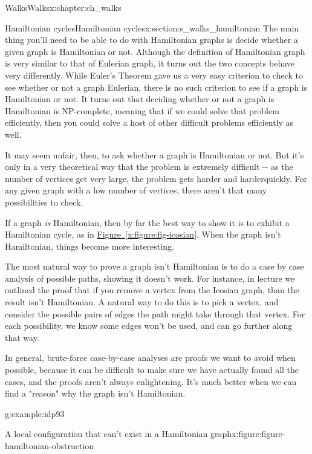 \documentclass[oneside,10pt,]{book}
\newcommand{\xreffont}{\relax}
\numberwithin{equation}{section}
\begin{document}
\begin{chapterptx}{Walks}{}{Walks}{}{}{x:chapter:ch_walks}
\begin{sectionptx}{Hamiltonian cycles}{}{Hamiltonian cycles}{}{}{x:section:s_walks_hamiltonian}
The main thing you'll need to be able to do with Hamiltonian graphs is decide whether a given graph is Hamiltonian or not.  Although the definition of Hamiltonian graph is very similar to that of Eulerian graph, it turns out the two concepts behave very differently.  While Euler's Theorem gave us a very easy criterion to check to see whether or not a graph Eulerian, there is no such criterion to see if a graph is Hamiltonian or not.  It turns out that deciding whether or not a graph is Hamiltonian is NP-complete, meaning that if we could solve that problem efficiently, then you could solve a host of other difficult problems efficiently as well.%
\par
It may seem unfair, then, to ask whether a graph is Hamiltonian or not.  But it's only in a very theoretical way that the problem is extremely difficult -{}-{} as the number of vertices get very large, the problem gets harder and harderquickly.  For any given graph with a low number of vertices, there aren't that many possibilities to check.%
\par
If a graph \emph{is} Hamiltonian, then by far the best way to show it is to exhibit a Hamiltonian cycle, as in \hyperref[x:figure:fig-icosian]{Figure~{\xreffont\ref{x:figure:fig-icosian}}}.  When the graph isn't Hamiltonian, things become more interesting.%
\par
The most natural way to prove a graph isn't Hamiltonian is to do a case by case analysis of possible paths, showing it doesn't work.  For instance, in lecture we outlined the proof that if you remove a vertex from the Icosian graph, than the result isn't Hamiltonian.  A natural way to do this is to pick a vertex, and consider the possible pairs of edges the path might take through that vertex.  For each possibility, we know some edges won't be used, and can go further along that way.%
\par
In general, brute-force case-by-case analyses are proofs we want to avoid when possible, because it can be difficult to make sure we have actually found all the cases, and the proofs aren't always enlightening.  It's much better when we can find a "reason" why the graph isn't Hamiltonian.%
\begin{example}{}{g:example:idp93}%
\begin{figureptx}{A local configuration that can't exist in a Hamiltonian graph}{x:figure:figure-hamiltonian-obstruction}{}%
\begin{image}{0.15}{0.7}{0.15}%
\resizebox{\linewidth}{!}{%
\begin{tikzpicture}


\end{tikzpicture}}
\end{image}
\end{figureptx}
\end{example}
\end{sectionptx}
\end{chapterptx}
\end{document}

